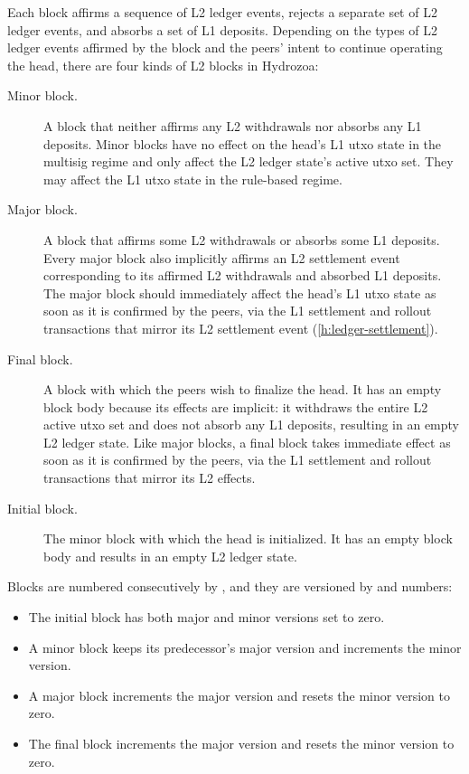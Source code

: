 \documentclass[../hydrozoa.tex]{subfiles}
\begin{document}
Each block affirms a sequence of L2 ledger events, rejects a separate set of L2 ledger events, and absorbs a set of L1 deposits.
Depending on the types of L2 ledger events affirmed by the block and the peers' intent to continue operating the head, there are four kinds of L2 blocks in Hydrozoa:
\begin{description}
  \item[Minor block.] A block that neither affirms any L2 withdrawals nor absorbs any L1 deposits.
    Minor blocks have no effect on the head's L1 utxo state in the multisig regime and only affect the L2 ledger state's active utxo set.
    They may affect the L1 utxo state in the rule-based regime.
  \item[Major block.] A block that affirms some L2 withdrawals or absorbs some L1 deposits.
    Every major block also implicitly affirms an L2 settlement event corresponding to its affirmed L2 withdrawals and absorbed L1 deposits.
    The major block should immediately affect the head's L1 utxo state as soon as it is confirmed by the peers, via the L1 settlement and rollout transactions that mirror its L2 settlement event (\cref{h:ledger-settlement}).
  \item[Final block.] A block with which the peers wish to finalize the head.
    It has an empty block body because its effects are implicit: it withdraws the entire L2 active utxo set and does not absorb any L1 deposits, resulting in an empty L2 ledger state.
    Like major blocks, a final block takes immediate effect as soon as it is confirmed by the peers, via the L1 settlement and rollout transactions that mirror its L2 effects.
  \item[Initial block.] The minor block with which the head is initialized.
    It has an empty block body and results in an empty L2 ledger state.
\end{description}

Blocks are numbered consecutively by , and they are versioned by  and  numbers:
\begin{itemize}
  \item The initial block has both major and minor versions set to zero.
  \item A minor block keeps its predecessor's major version and increments the minor version.
  \item A major block increments the major version and resets the minor version to zero.
  \item The final block increments the major version and resets the minor version to zero.
\end{itemize}
\end{document}
